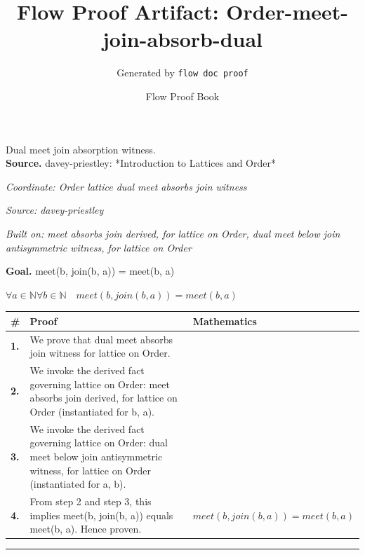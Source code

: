 \documentclass[11pt]{article}
\title{Flow Proof Artifact: Order-meet-join-absorb-dual}
\author{Generated by \texttt{flow doc proof}}
\date{Flow Proof Book}
\theoremstyle{definition}
\begin{document}
\maketitle
Dual meet join absorption witness.\\[0.5em]
\textbf{Source.} davey-priestley: *Introduction to Lattices and Order*\\[0.5em]
\bigskip
{}\par
\smallskip\noindent\textit{Coordinate: Order \cdot lattice \cdot dual meet absorbs join witness}\par
\smallskip\noindent\textit{Source: davey-priestley}\par
\smallskip\noindent\textit{Built on: meet absorbs join derived, for lattice on Order, dual meet below join antisymmetric witness, for lattice on Order}\par
\medskip
\noindent\textbf{Goal.} meet(b, join(b, a)) = meet(b, a)\par
\noindent$\displaystyle \forall a \in \mathbb{N} \forall b \in \mathbb{N}\quad meet(b, join(b, a)) = meet(b, a)$\par
\medskip
\noindent
\begin{tabular}{@{} >{\raggedright\arraybackslash}p{} >{\raggedright\arraybackslash}p{} >{\raggedleft\arraybackslash}p{} @{}}
\textbf{\#} & \textbf{Proof} & \textbf{Mathematics} \\
\midrule
\textbf{1.} & We prove that dual meet absorbs join witness for lattice on Order. & \\[0.45em]
\textbf{2.} & We invoke the derived fact governing lattice on Order: meet absorbs join derived, for lattice on Order (instantiated for b, a). & \\[0.45em]
\textbf{3.} & We invoke the derived fact governing lattice on Order: dual meet below join antisymmetric witness, for lattice on Order (instantiated for a, b). & \\[0.45em]
\textbf{4.} & From step 2 and step 3, this implies meet(b, join(b, a)) equals meet(b, a). Hence proven. & $\displaystyle meet(b, join(b, a)) = meet(b, a)$ \\[0.45em]
\bottomrule
\end{tabular}
\label{thm:Order-lattice-dual_meet_absorbs_join_witness}
\par\medskip\hrule
\end{document}
